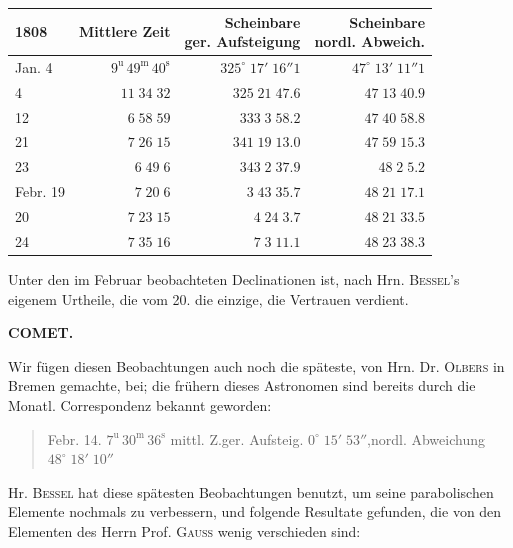 \begin{center}\fontsize{10}{12}\selectfont\setlength{\tabcolsep}{3pt}\renewcommand{\arraystretch}{1.15}\begin{tabular}{l|r|r|r}
1808 & Mittlere Zeit & \shortstack{Scheinbare\\ger. Aufsteigung} & \shortstack{Scheinbare\\nordl. Abweich.}\\\hline
Jan. 4 & $9^{\text{u}}\,49^{\text{m}}\,40^{\text{s}}$ & $325^\circ\;17'\;16''1$ & $47^\circ\;13'\;11''1$\\
4 & $11\;34\;32$ & $325\;21\;47.6$ & $47\;13\;40.9$\\
12 & $6\;58\;59$ & $333\;3\;58.2$ & $47\;40\;58.8$\\
21 & $7\;26\;15$ & $341\;19\;13.0$ & $47\;59\;15.3$\\
23 & $6\;49\;6$ & $343\;2\;37.9$ & $48\;2\;5.2$\\
Febr. 19 & $7\;20\;6$ & $3\;43\;35.7$ & $48\;21\;17.1$\\
20 & $7\;23\;15$ & $4\;24\;3.7$ & $48\;21\;33.5$\\
24 & $7\;35\;16$ & $7\;3\;11.1$ & $48\;23\;38.3$\\
\end{tabular}\end{center}

\par\indent Unter den im Februar beobachteten Declinationen ist, nach Hrn. \textsc{Bessel}'s eigenem Urtheile,
die vom 20. die einzige, die Vertrauen verdient.

\clearpage
\thispagestyle{empty}
\noindent{}%
\makebox[12mm][l]{}%
\parbox[t]{\dimexpr\linewidth-24mm\relax}{\centering\footnotesize\bfseries COMET.\par}%
\par\nobreak\medskip
\par\indent Wir fügen diesen Beobachtungen auch noch die späteste, von Hrn. Dr. \textsc{Olbers} in Bremen
gemachte, bei; die frühern dieses Astronomen sind bereits durch die Monatl. Correspondenz
bekannt geworden:

\begin{quote}
Febr. 14. $7^{\text{u}}\,30^{\text{m}}\,36^{\text{s}}$ mittl. Z.\quad ger. Aufsteig. $0^\circ\;15'\;53''$,\quad nordl. Abweichung $48^\circ\;18'\;10''$
\end{quote}

\par\indent Hr. \textsc{Bessel} hat diese spätesten Beobachtungen benutzt, um seine parabolischen Elemente
nochmals zu verbessern, und folgende Resultate gefunden, die von den Elementen des Herrn
Prof. \textsc{Gauss} wenig verschieden sind:


